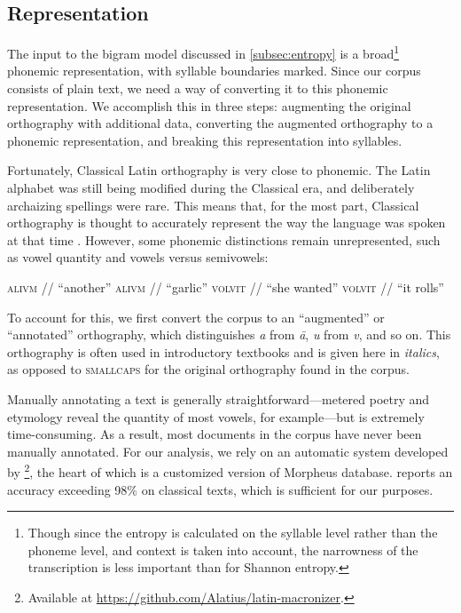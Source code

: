 \documentclass[12pt,twoside]{article}
\newcommand{\ipa}[1]{/\textipa{#1}/}
\begin{document}
\subsection{Representation}
\label{subsec:repr}

The input to the bigram model discussed in \ref{subsec:entropy} is a broad\footnote{Though since the entropy is calculated on the syllable level rather than the phoneme level, and context is taken into account, the narrowness of the transcription is less important than for Shannon entropy.} phonemic representation, with syllable boundaries marked. Since our corpus consists of plain text, we need a way of converting it to this phonemic representation. We accomplish this in three steps: augmenting the original orthography with additional data, converting the augmented orthography to a phonemic representation, and breaking this representation into syllables.

Fortunately, Classical Latin orthography is very close to phonemic. The Latin alphabet was still being modified during the Classical era, and deliberately archaizing spellings were rare. This means that, for the most part, Classical orthography is thought to accurately represent the way the language was spoken at that time \citep[9]{allen}. However, some phonemic distinctions remain unrepresented, such as vowel quantity and vowels versus semivowels:

\begin{exe}
\ex \textsc{alivm} \ipa{a.li.um} ``another''
\ex \textsc{alivm} \ipa{a:.li.um} ``garlic''
\ex \textsc{volvit} \ipa{wo.lu.it} ``she wanted''
\ex \textsc{volvit} \ipa{wol.wit} ``it rolls''
\end{exe}

To account for this, we first convert the corpus to an ``augmented'' or ``annotated'' orthography, which distinguishes \emph{a} from \emph{\=a}, \emph{u} from \emph{v}, and so on. This orthography is often used in introductory textbooks and is given here in \emph{italics}, as opposed to \textsc{smallcaps} for the original orthography found in the corpus.

Manually annotating a text is generally straightforward---metered poetry and etymology reveal the quantity of most vowels, for example---but is extremely time-consuming. As a result, most documents in the corpus have never been manually annotated. For our analysis, we rely on an automatic system developed by \citet{winge}\footnote{Available at \url{https://github.com/Alatius/latin-macronizer}.}, the heart of which is a customized version of  Morpheus database. \citet[27]{winge} reports an accuracy exceeding 98\% on classical texts, which is sufficient for our purposes.
\end{document}
